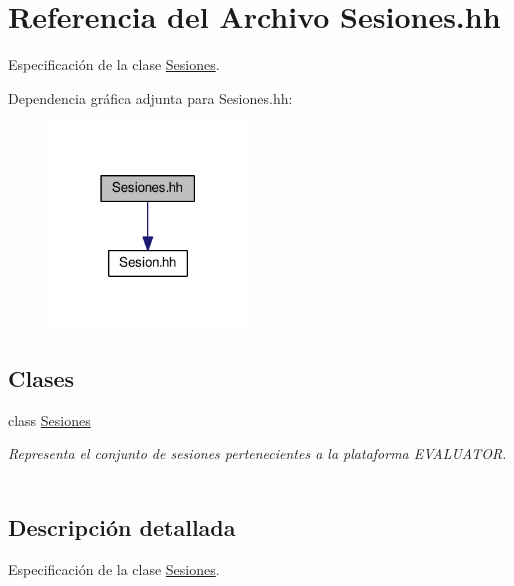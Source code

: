 \hypertarget{_sesiones_8hh}{}\section{Referencia del Archivo Sesiones.\+hh}
\label{_sesiones_8hh}


Especificación de la clase \mbox{\hyperlink{class_sesiones}{Sesiones}}.  


Dependencia gráfica adjunta para Sesiones.\+hh\+:
\nopagebreak
\begin{figure}[H]
\begin{center}
\leavevmode
\includegraphics[width=150pt]{_sesiones_8hh__incl}
\end{center}
\end{figure}
\subsection*{Clases}
\begin{DoxyCompactItemize}
\item 
class \mbox{\hyperlink{class_sesiones}{Sesiones}}
\begin{DoxyCompactList}\small\item\em Representa el conjunto de sesiones pertenecientes a la plataforma E\+V\+A\+L\+U\+A\+T\+OR. ~\newline
 \end{DoxyCompactList}\end{DoxyCompactItemize}


\subsection{Descripción detallada}
Especificación de la clase \mbox{\hyperlink{class_sesiones}{Sesiones}}. 


